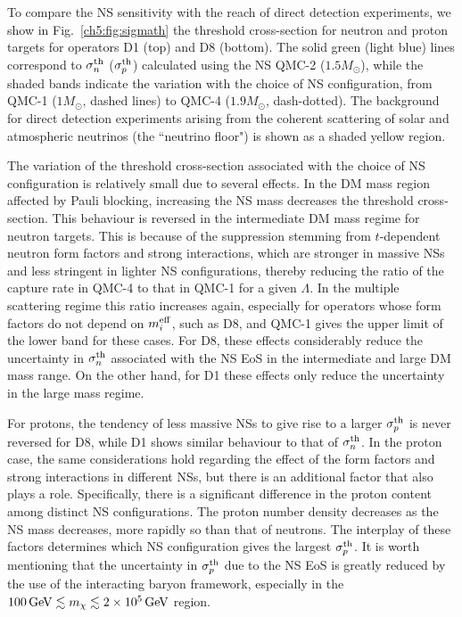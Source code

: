 To compare the NS sensitivity with the reach of direct detection experiments, we show in Fig.~\ref{ch5:fig:sigmath} the threshold cross-section for neutron and proton targets for operators  D1 (top) and D8 (bottom). The solid green (light blue) lines correspond to $\sigma^\mathrm{th}_n$ ($\sigma^\mathrm{th}_p$) calculated using the NS QMC-2 ($1.5 M_\odot$),  while the shaded bands indicate the variation with the choice of NS configuration, from  QMC-1 ($1M_\odot$, dashed lines) to QMC-4 ($1.9 M_\odot$, dash-dotted). The background for direct detection experiments arising from the coherent scattering of solar and atmospheric neutrinos (the ``neutrino floor") is shown as a shaded yellow region. 

The variation of the threshold cross-section associated with the choice of NS configuration is relatively small due to several effects. In the DM mass region affected by Pauli blocking, increasing the NS mass decreases the threshold cross-section. This behaviour is reversed in the intermediate DM mass regime for neutron targets. This is because of the suppression stemming from $t$-dependent neutron form factors and strong interactions, which are stronger in massive NSs and less stringent in lighter NS configurations, thereby reducing the ratio of the capture rate in QMC-4 to that in QMC-1 for a given $\Lambda$. In the multiple scattering regime this ratio increases again, especially for operators whose form factors do not depend on $m_i^{\rm eff}$, such as D8, and  QMC-1 gives the upper limit of the lower band for these cases. For D8, these effects considerably reduce the uncertainty in $\sigma^\mathrm{th}_n$ associated with the NS EoS in the intermediate and large DM mass range. On the other hand, for D1 these effects only reduce the uncertainty in the large mass regime. 

For protons, the tendency of less massive NSs to give rise to a larger $\sigma^\mathrm{th}_p$ is never reversed for D8, while D1 shows similar behaviour to that of $\sigma^\mathrm{th}_n$. In the proton case, the same considerations hold regarding the effect of the form factors and strong interactions in different NSs, but there is an additional factor that also plays a role. Specifically, there is a significant difference in the proton content among distinct NS configurations. The proton number density decreases as the NS mass decreases, more rapidly so than that of neutrons. The interplay of these factors determines which NS configuration gives the largest $\sigma^\mathrm{th}_p$. It is worth mentioning that the uncertainty in $\sigma^\mathrm{th}_p$ due to the NS EoS is greatly reduced by the use of the interacting baryon framework, especially in the $100{\rm \,GeV}\lesssim m_\chi\lesssim2\times10^5{\rm \,GeV}$ region. 


